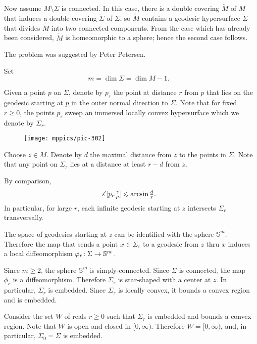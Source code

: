 Now assume $M\setminus\Sigma$ is connected.
In this case, there is a double covering $\tilde M$ of $M$ that induces a double covering $\tilde\Sigma$ of $\Sigma$,
so $\tilde M$ contains a geodesic hypersurface $\tilde\Sigma$ that divides $\tilde M$ into two connected components. 
From the case which has already been considered, $\tilde M$ is homeomorphic to a sphere;
hence the second case follows.
\qeds

The problem was suggested by Peter Petersen.



Set 
\[m=\dim \Sigma=\dim M-1.\]

Given a point $p$ on $\Sigma$, denote by $p_r$ the point at distance $r$ from $p$
that lies on the geodesic starting at $p$ in the outer normal direction to $\Sigma$.
Note that for fixed $r\ge 0$,
the points $p_r$ sweep an immersed locally convex hypersurface which we denote by $\Sigma_r$.

\begin{wrapfigure}{o}{61 mm}
\vskip-2mm
\centering
\texttt{[image: mppics/pic-302]}
\end{wrapfigure}

Choose $z\in M$. 
Denote by $d$ the maximal distance from $z$ to the points in $\Sigma$.
Note that 
any point on $\Sigma_r$
lies at a distance at least $r-d$ from $z$.

By comparison, 
\[\measuredangle[p_r\,{}^{z}_{p}]\leqslant \arcsin\tfrac dr.\]
In particular, for large $r$, 
each infinite geodesic starting at $z$ intersects $\Sigma_r$ transversally.

The space of geodesics starting at $z$ can be identified with the sphere $\mathbb{S}^m$.
Therefore the map that sends a point $x\in \Sigma_r$ to a geodesic from $z$ thru $x$ induces a local diffeomorphism $\phi_r\:\Sigma\z\to\mathbb{S}^m$.

Since $m\ge 2$, the sphere $\mathbb{S}^m$ is simply-connected.
Since $\Sigma$ is connected, the map $\phi_r$ is a diffeomorphism.
Therefore $\Sigma_r$ is star-shaped with a center at $z$.
In particular, $\Sigma_r$ is embedded.
Since $\Sigma_r$ is locally convex, it bounds a convex region and is embedded.

Consider the set $W$ of reals $r\ge 0$ such that $\Sigma_r$ is embedded and bounds a convex region.
Note that $W$ is open and closed in $[0,\infty)$.
Therefore $W=[0,\infty)$, and, in particular, $\Sigma_0=\Sigma$ is embedded.\qeds


